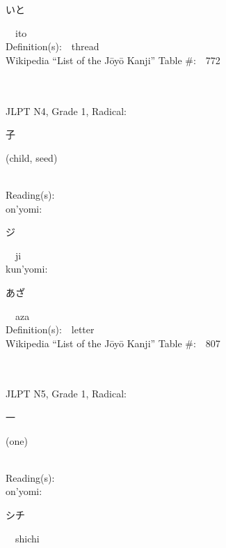 \begin{multicols}{2}
{\hspace*{2em}}{\begin{CJK}{UTF8}{min} いと \end{CJK}}\ \ ito\ \ \\
Definition(s):\ \ thread \\
Wikipedia ``List of the J\=oy\=o Kanji'' Table \#:\ \ 772 \\
\ \ \\
{\fontsize{34pt}{40pt}  }\ \ \\  %
{JLPT N4, Grade 1, Radical:\ \ {\begin{CJK}{UTF8}{min} 子 \end{CJK}} (child, seed) } \\
Reading(s):\ \ \\
{\hspace*{1em}}on'yomi:\ \ \\
{\hspace*{2em}}{\begin{CJK}{UTF8}{min} ジ \end{CJK}}\ \ ji\ \ \\
{\hspace*{1em}}kun'yomi:\ \ \\
{\hspace*{2em}}{\begin{CJK}{UTF8}{min} あざ \end{CJK}}\ \ aza\ \ \\
Definition(s):\ \ letter \\
Wikipedia ``List of the J\=oy\=o Kanji'' Table \#:\ \ 807 \\
\ \ \\
{\fontsize{34pt}{40pt}  }\ \ \\  %
{JLPT N5, Grade 1, Radical:\ \ {\begin{CJK}{UTF8}{min} 一 \end{CJK}} (one) } \\
Reading(s):\ \ \\
{\hspace*{1em}}on'yomi:\ \ \\
{\hspace*{2em}}{\begin{CJK}{UTF8}{min} シチ \end{CJK}}\ \ shichi\ \ \\

\end{multicols}
